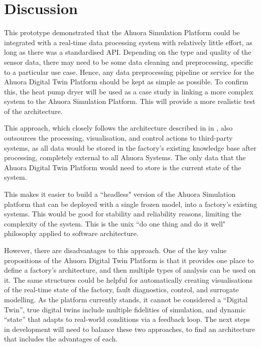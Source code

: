 \section{Discussion} \label{sec:prototypeinsights}

This prototype demonstrated that the Ahuora Simulation Platform could be integrated with a real-time data processing system with relatively little effort, as long as there was a standardised API. 
Depending on the type and quality of the sensor data, there may need to be some data cleaning and preprocessing, specific to a particular use case. 
Hence, any data preprocessing pipeline or service for the Ahuora Digital Twin Platform should be kept as simple as possible.
To confirm this, the heat pump dryer will be used as a case study in linking a more complex system to the Ahuora Simulation Platform. This will provide a more realistic test of the architecture.

This approach, which closely follows the architecture described in  in , also outsources the processing, visualisation, and control actions to third-party systems, as all data would be stored in the factory's existing knowledge base after processing, completely external to all Ahuora Systems. The only data that the Ahuora Digital Twin Platform would need to store is the current state of the system. 

This makes it easier to build a ``headless" version of the Ahuora Simulation platform that can be deployed with a single frozen model, into a factory's existing systems. 
This would be good for stability and reliability reasons, limiting the complexity of the system. This is the unix ``do one thing and do it well" philosophy applied to software architecture.


However, there are disadvantages to this approach. One of the key value propositions of the Ahuora Digital Twin Platform is that it provides one place to define a factory's architecture, and then multiple types of analysis can be used on it. The same structures could be helpful for automatically creating visualisations of the real-time state of the factory, fault diagnostics, control, and surrogate modelling. As the platform currently stands, it cannot be considered a ``Digital Twin'', true digital twins include multiple fidelities of simulation, and dynamic ``state'' that adapts to real-world conditions via a feedback loop. The next steps in development will need to balance these two approaches, to find an architecture that includes the advantages of each.
